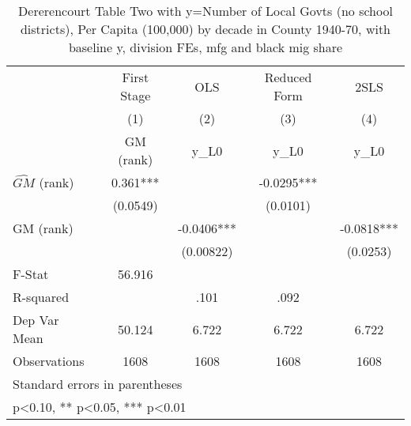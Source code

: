 \begin{table}[htbp]\centering
\def\sym#1{\ifmmode^{#1}\else\(^{#1}\)\fi}
\caption{Dererencourt Table Two with y=Number of Local Govts (no school districts), Per Capita (100,000) by decade in County 1940-70, with baseline y, division FEs, mfg and black mig share}
\begin{tabular}{l*{4}{c}}
\toprule
                    & First Stage   &         OLS   &Reduced Form   &        2SLS   \\
                    &\multicolumn{1}{c}{(1)}&\multicolumn{1}{c}{(2)}&\multicolumn{1}{c}{(3)}&\multicolumn{1}{c}{(4)}\\
                    &\multicolumn{1}{c}{GM  (rank)}&\multicolumn{1}{c}{y\_L0}&\multicolumn{1}{c}{y\_L0}&\multicolumn{1}{c}{y\_L0}\\
\midrule
$\hat{GM}$ (rank)   &       0.361***&               &     -0.0295***&               \\
                    &    (0.0549)   &               &    (0.0101)   &               \\
\addlinespace
GM  (rank)          &               &     -0.0406***&               &     -0.0818***\\
                    &               &   (0.00822)   &               &    (0.0253)   \\
\midrule
F-Stat              &      56.916   &               &               &               \\
R-squared           &               &        .101   &        .092   &               \\
Dep Var Mean        &      50.124   &       6.722   &       6.722   &       6.722   \\
Observations        &        1608   &        1608   &        1608   &        1608   \\
\bottomrule
\multicolumn{5}{l}{\footnotesize Standard errors in parentheses}\\
\multicolumn{5}{l}{\footnotesize * p<0.10, ** p<0.05, *** p<0.01}\\
\end{tabular}
\end{table}
